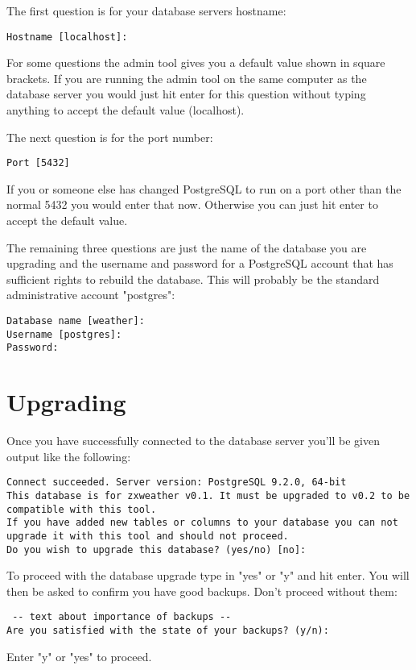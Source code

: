 \documentclass[a4paper,10pt,draft]{book}
\begin{document}
The first question is for your database servers hostname:
\begin{verbatim}
Hostname [localhost]:
\end{verbatim}
For some questions the admin tool gives you a default value shown in square brackets. If you are running the admin tool on the same computer as the database server you would just hit enter for this question without typing anything to accept the default value (localhost).

The next question is for the port number:
\begin{verbatim}
Port [5432]
\end{verbatim}
If you or someone else has changed PostgreSQL to run on a port other than the normal 5432 you would enter that now. Otherwise you can just hit enter to accept the default value.

The remaining three questions are just the name of the database you are upgrading and the username and password for a PostgreSQL account that has sufficient rights to rebuild the database. This will probably be the standard administrative account "postgres":
\begin{verbatim}
Database name [weather]: 
Username [postgres]:
Password: 
\end{verbatim}

\section{Upgrading}
Once you have successfully connected to the database server you'll be given output like the following:
\begin{verbatim}
Connect succeeded. Server version: PostgreSQL 9.2.0, 64-bit
This database is for zxweather v0.1. It must be upgraded to v0.2 to be
compatible with this tool.
If you have added new tables or columns to your database you can not 
upgrade it with this tool and should not proceed.
Do you wish to upgrade this database? (yes/no) [no]:
\end{verbatim}

To proceed with the database upgrade type in "yes" or "y" and hit enter. You will then be asked to confirm you have good backups. Don't proceed without them:
\begin{verbatim}
 -- text about importance of backups --
Are you satisfied with the state of your backups? (y/n):
\end{verbatim}

Enter "y" or "yes" to proceed.
\end{document}
